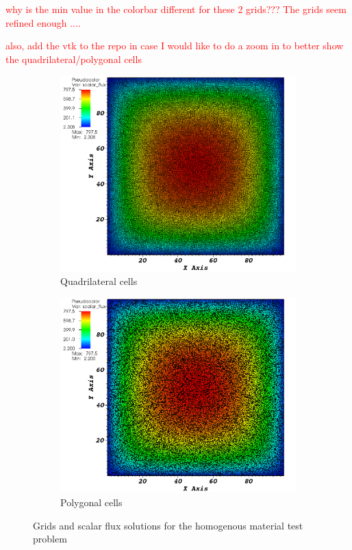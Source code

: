 \textcolor{red}{why is the min value in the colorbar different for these 2 grids??? The grids seem refined enough ....}

\textcolor{red}{also, add the vtk to the repo in case I would like to do a zoom in to better show the quadrilateral/polygonal cells}
%
\begin{figure}[!htbp]
  \centering
  \begin{subfigure}{0.75\textwidth}
    \centering
    \includegraphics[width=\textwidth]{big_homog_quad_crop}
    \caption{Quadrilateral cells}
  \end{subfigure}
  \begin{subfigure}{0.75\textwidth}
    \centering
    \includegraphics[width=\textwidth]{big_homog_poly_crop}
    \caption{Polygonal cells}
  \end{subfigure}
  \caption{Grids and scalar flux solutions for the homogenous material test problem}
  \label{homog_test}
\end{figure}
